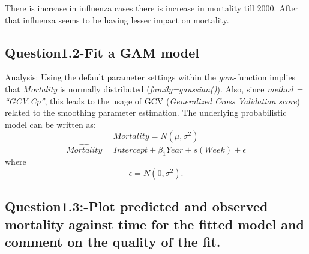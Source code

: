 \documentclass[]{article}
\newenvironment{Shaded}{\begin{snugshade}}{\end{snugshade}}
\newcommand{\KeywordTok}[1]{\textcolor[rgb]{0.13,0.29,0.53}{\textbf{#1}}}
\newcommand{\DataTypeTok}[1]{\textcolor[rgb]{0.13,0.29,0.53}{#1}}
\newcommand{\StringTok}[1]{\textcolor[rgb]{0.31,0.60,0.02}{#1}}
\newcommand{\OperatorTok}[1]{\textcolor[rgb]{0.81,0.36,0.00}{\textbf{#1}}}
\newcommand{\NormalTok}[1]{#1}
\begin{document}
There is increase in influenza cases there is increase in mortality till
2000. After that influenza seems to be having lesser impact on
mortality.

\subsection{Question1.2-Fit a GAM
model}\label{question1.2-fit-a-gam-model}

\begin{Shaded}
\end{Shaded}

Analysis: Using the default parameter settings within the
\emph{gam}-function implies that \emph{Mortality} is normally
distributed (\emph{family=gaussian()}). Also, since \emph{method =
``GCV.Cp''}, this leads to the usage of GCV (\emph{Generalized Cross
Validation score}) related to the smoothing parameter estimation. The
underlying probabilistic model can be written as:
\[ Mortality = N(\mu, \sigma^2) \]
\[ \hat{Mortality} = Intercept + \beta_1Year + s(Week) + \epsilon     \]
where \[ \epsilon = N(0, \sigma^2) .\]

\subsection{Question1.3:-Plot predicted and observed mortality against
time for the fitted model and comment on the quality of the
fit.}\label{question1.3-plot-predicted-and-observed-mortality-against-time-for-the-fitted-model-and-comment-on-the-quality-of-the-fit.}
\end{document}

